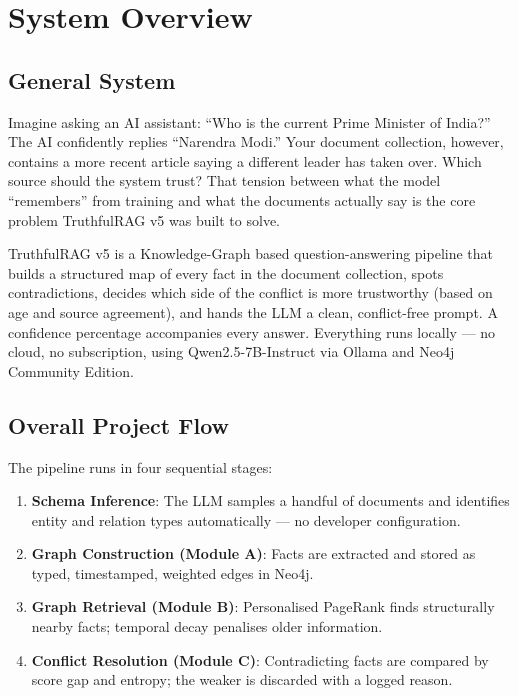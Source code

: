 

\section{System Overview}

\subsection{General System}

Imagine asking an AI assistant: ``Who is the current Prime Minister of India?''
The AI confidently replies ``Narendra Modi.'' Your document collection, however,
contains a more recent article saying a different leader has taken over.
Which source should the system trust? That tension between what the model
``remembers'' from training and what the documents actually say is the
core problem TruthfulRAG v5 was built to solve.

TruthfulRAG v5 is a Knowledge-Graph based question-answering pipeline that builds
a structured map of every fact in the document collection, spots contradictions,
decides which side of the conflict is more trustworthy (based on age and source
agreement), and hands the LLM a clean, conflict-free prompt. A confidence
percentage accompanies every answer. Everything runs locally — no cloud, no
subscription, using Qwen2.5-7B-Instruct via Ollama and Neo4j Community Edition.

\subsection{Overall Project Flow}

The pipeline runs in four sequential stages:
\begin{enumerate}\itemsep0pt
    \item \textbf{Schema Inference}: The LLM samples a handful of documents and
    identifies entity and relation types automatically — no developer configuration.
    \item \textbf{Graph Construction (Module A)}: Facts are extracted and stored
    as typed, timestamped, weighted edges in Neo4j.
    \item \textbf{Graph Retrieval (Module B)}: Personalised PageRank finds
    structurally nearby facts; temporal decay penalises older information.
    \item \textbf{Conflict Resolution (Module C)}: Contradicting facts are
    compared by score gap and entropy; the weaker is discarded with a logged reason.
\end{enumerate}

